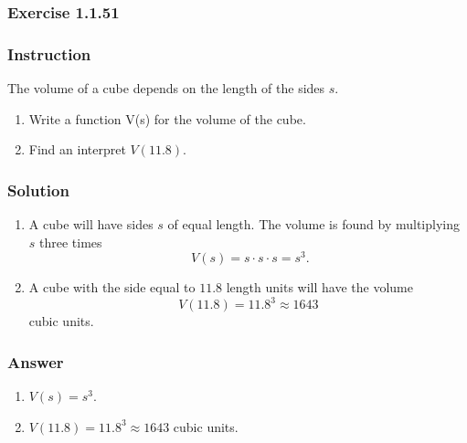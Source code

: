 \subsubsection*{Exercise 1.1.51}

\subsubsection*{Instruction}

The volume of a cube depends on the length of the sides $ s $.

\begin{enumerate}[label = (\alph*)]
  \item
    Write a function V(s) for the volume of the cube.
  \item
    Find an interpret $ V(11.8) $.
\end{enumerate}

\subsubsection*{Solution}

\begin{enumerate}[label = (\alph*)]
  \item
    A cube will have sides $ s $ of equal length. The volume is found by multiplying $ s $ three times
    $$ \phantom{.}
    V(s) = s \cdot s \cdot s = s^3
    .$$
  \item
    A cube with the side equal to $ 11.8 $ length units will have the volume
    $$
    V(11.8) = 11.8^3 \approx 1643
    $$
    cubic units.
\end{enumerate}

\subsubsection*{Answer}

\begin{enumerate}[label = (\alph*)]
  \item
    $ V(s) = s^3 $.
  \item
    $ V(11.8) = 11.8^3 \approx 1643 $ cubic units.
\end{enumerate}
